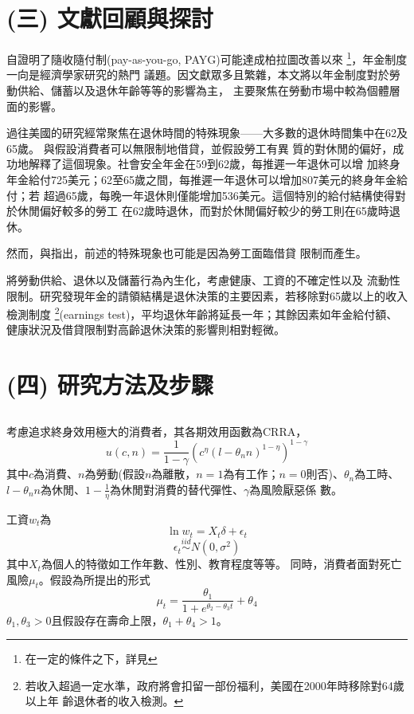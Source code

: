 \documentclass[12pt]{article}
\begin{document}
\begin{CJK*}{UTF8}{bkai}
\section*{\normalfont(三) 文獻回顧與探討}

自\cite{samuelson1958}證明了隨收隨付制(pay-as-you-go, PAYG)可能達成柏拉圖改善以來
\footnote{在一定的條件之下，詳見\cite{aaron1966}}，年金制度一向是經濟學家研究的熱門
議題。因文獻眾多且繁雜，本文將以年金制度對於勞動供給、儲蓄以及退休年齡等等的影響為主，
主要聚焦在勞動市場中較為個體層面的影響。

過往美國的研究經常聚焦在退休時間的特殊現象——大多數的退休時間集中在62及65歲。
\cite{burtless1986}與\cite{gustman1986}假設消費者可以無限制地借貸，並假設勞工有異
質的對休閒的偏好，成功地解釋了這個現象。社會安全年金在59到62歲，每推遲一年退休可以增
加終身年金給付725美元；62至65歲之間，每推遲一年退休可以增加807美元的終身年金給付；若
超過65歲，每晚一年退休則僅能增加536美元。這個特別的給付結構使得對於休閒偏好較多的勞工
在62歲時退休，而對於休閒偏好較少的勞工則在65歲時退休。

然而，\cite{stock1990}與\cite{rust1997}指出，前述的特殊現象也可能是因為勞工面臨借貸
限制而產生。

\cite{french2005}將勞動供給、退休以及儲蓄行為內生化，考慮健康、工資的不確定性以及
流動性限制。研究發現年金的請領結構是退休決策的主要因素，若移除對65歲以上的收入檢測制度
\footnote{若收入超過一定水準，政府將會扣留一部份福利，美國在2000年時移除對64歲以上年
齡退休者的收入檢測。}(earnings test)，平均退休年齡將延長一年；其餘因素如年金給付額、
健康狀況及借貸限制對高齡退休決策的影響則相對輕微。


\section*{\normalfont(四) 研究方法及步驟}

\subsection*{}
考慮追求終身效用極大的消費者，其各期效用函數為CRRA，
\begin{equation}
    u(c,n) = \frac{1}{1-\gamma}(c^\eta (l-\theta_n n)^{1-\eta})^{1-\gamma}
\end{equation}
其中$c$為消費、$n$為勞動(假設$n$為離散，$n=1$為有工作；$n=0$則否)、$\theta_n$為工時、
$l-\theta_n n$為休閒、$1-\frac{1}{\eta}$為休閒對消費的替代彈性、$\gamma$為風險厭惡係
數。

工資$w_t$為
\begin{equation}
    \ln w_t = X_t\delta + \epsilon_t
\end{equation}
\begin{equation}
    \epsilon_t \overset{iid}{\sim} N(0,\sigma^2)
\end{equation}
其中$X_t$為個人的特徵如工作年數、性別、教育程度等等。
同時，消費者面對死亡風險$\mu_t$。假設為\cite{thatcher1999}所提出的形式
\begin{equation}
    \mu_t = \frac{\theta_1}{1+ e^{\theta_2 - \theta_3 t}} + \theta_4
\end{equation}
$\theta_1,\theta_3 > 0$且假設存在壽命上限，$\theta_1+\theta_4 > 1$。


\end{CJK*}
\end{document}
